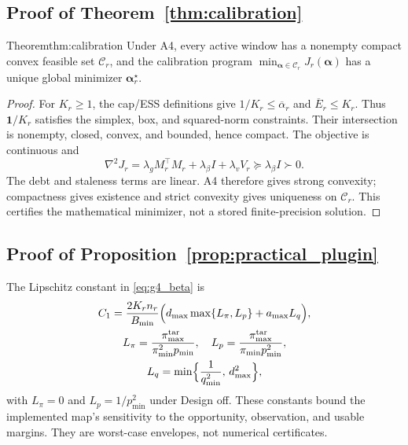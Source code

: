 \subsection{Proof of Theorem~\ref{thm:calibration}}
\begin{restated}{Theorem}{thm:calibration}
Under A4, every active window has a nonempty compact convex feasible set
$\mathcal{C}_r$, and the calibration program
$\min_{\boldsymbol\alpha\in\mathcal{C}_r}J_r(\boldsymbol\alpha)$
has a unique global minimizer $\boldsymbol\alpha_r^\star$.
\end{restated}
\begin{proof}

For $K_r\ge1$, the cap/ESS definitions give
$1/K_r\le\overline\alpha_r$ and $\overline E_r\le K_r$.
Thus $\mathbf1/K_r$ satisfies the simplex, box, and squared-norm constraints.
Their intersection is nonempty, closed, convex, and bounded, hence compact.
The objective is continuous and
\begin{equation}
\nabla^2J_r=\lambda_gM_r^\top M_r+\lambda_\beta I+\lambda_vV_r
\succeq\lambda_\beta I\succ0.
\label{eq:app_P2_hessian}
\end{equation}
The debt and staleness terms are linear.  A4 therefore gives strong convexity;
compactness gives existence and strict convexity gives uniqueness on
$\mathcal C_r$.  This certifies the mathematical minimizer, not a stored
finite-precision solution.
\end{proof}

\subsection{Proof of Proposition~\ref{prop:practical_plugin}}
The Lipschitz constant in \eqref{eq:g4_beta} is
\begin{multline}
C_1
=
\frac{2K_r n_r}{B_{\min}}
\Bigl(
d_{\max}\max\{L_\pi,L_p\}+a_{\max}L_q
\Bigr),\\
L_\pi=\frac{\pi^{\mathrm{tar}}_{\max}}{\pi_{\min}^2 p_{\min}},\quad
L_p=\frac{\pi^{\mathrm{tar}}_{\max}}{\pi_{\min}p_{\min}^2},\\
L_q=\min\Bigl\{\frac{1}{q_{\min}^2},\,d_{\max}^2\Bigr\},
\label{eq:g4_c1}
\end{multline}
with $L_\pi=0$ and $L_p=1/p_{\min}^2$ under Design off. These constants bound
the implemented map's sensitivity to the opportunity, observation, and usable
margins. They are worst-case envelopes, not numerical certificates.

